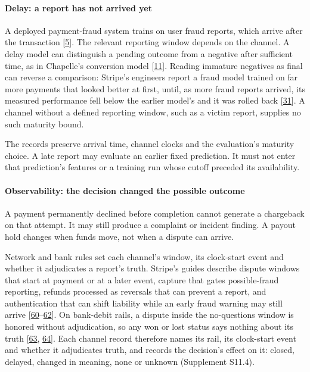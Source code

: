 \documentclass[
  11pt,
]{article}
\begin{document}
\hypertarget{delay-a-report-has-not-arrived-yet}{%
\paragraph{Delay: a report has not arrived
yet}\label{delay-a-report-has-not-arrived-yet}}

A deployed payment-fraud system trains on user fraud reports, which
arrive after the transaction
{[}\protect\hyperlink{ref-Cao2019TitAnt}{5}{]}. The relevant reporting
window depends on the channel. A delay model can distinguish a pending
outcome from a negative after sufficient time, as in Chapelle's
conversion model {[}\protect\hyperlink{ref-Chapelle2014Delayed}{11}{]}.
Reading immature negatives as final can reverse a comparison: Stripe's
engineers report a fraud model trained on far more payments that looked
better at first, until, as more fraud reports arrived, its measured
performance fell below the earlier model's and it was rolled back
{[}\protect\hyperlink{ref-Drapeau2026ScalingRadar}{31}{]}. A channel
without a defined reporting window, such as a victim report, supplies no
such maturity bound.

The records preserve arrival time, channel clocks and the evaluation's
maturity choice. A late report may evaluate an earlier fixed prediction.
It must not enter that prediction's features or a training run whose
cutoff preceded its availability.

\hypertarget{observability-the-decision-changed-the-possible-outcome}{%
\paragraph{Observability: the decision changed the possible
outcome}\label{observability-the-decision-changed-the-possible-outcome}}

A payment permanently declined before completion cannot generate a
chargeback on that attempt. It may still produce a complaint or incident
finding. A payout hold changes when funds move, not when a dispute can
arrive.

Network and bank rules set each channel's window, its clock-start event
and whether it adjudicates a report's truth. Stripe's guides describe
dispute windows that start at payment or at a later event, capture that
gates possible-fraud reporting, refunds processed as reversals that can
prevent a report, and authentication that can shift liability while an
early fraud warning may still arrive
{[}\protect\hyperlink{ref-Stripe2026Disputes}{60}--\protect\hyperlink{ref-Stripe2026ThreeDS}{62}{]}.
On bank-debit rails, a dispute inside the no-questions window is honored
without adjudication, so any won or lost status says nothing about its
truth {[}\protect\hyperlink{ref-Stripe2026SEPADebit}{63},
\protect\hyperlink{ref-Stripe2026ACHTerms}{64}{]}. Each channel record
therefore names its rail, its clock-start event and whether it
adjudicates truth, and records the decision's effect on it: closed,
delayed, changed in meaning, none or unknown (Supplement S11.4).
\end{document}
